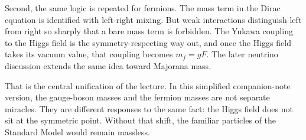 Second, the same logic is repeated for fermions. The mass term in the Dirac equation is identified with left-right mixing. But weak interactions distinguish left from right so sharply that a bare mass term is forbidden. The Yukawa coupling to the Higgs field is the symmetry-respecting way out, and once the Higgs field takes its vacuum value, that coupling becomes \(m_f=gF\). The later neutrino discussion extends the same idea toward Majorana mass.

That is the central unification of the lecture. In this simplified companion-note version, the gauge-boson masses and the fermion masses are not separate miracles. They are different responses to the same fact: the Higgs field does not sit at the symmetric point. Without that shift, the familiar particles of the Standard Model would remain massless.